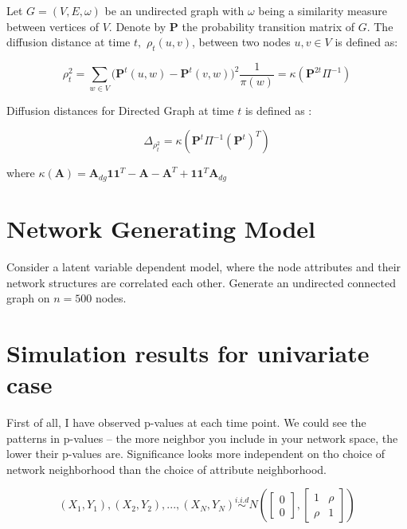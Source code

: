 \documentclass[12pt]{report}
\begin{document}
  
  Let $G = (V, E, \omega)$ be an undirected graph with $\omega$ being a similarity measure between vertices of $V.$ Denote by $\textbf{P}$ the probability transition matrix of $G.$ The diffusion distance at time $t,$ $\rho_{t}(u,v)$, between two nodes $u,v \in V$ is defined as:
  
  $$\rho^2_{t} = \sum\limits_{w \in V}\big( \textbf{P}^{t}(u,w) - \textbf{P}^{t}(v,w) \big)^2 \frac{1}{\pi(w)} =  \kappa(\textbf{P}^{2t} \Pi^{-1} )$$

 
Diffusion distances for Directed Graph at time $t$ is defined as :

$$\Delta_{\rho^{2}_{t}} = \kappa(\textbf{P}^{t} \Pi^{-1} (\textbf{P}^{t})^{T} )$$
 
where $\kappa(\textbf{A}) = \textbf{A}_{dg} \textbf{1} \textbf{1}^{T} - \textbf{A} - \textbf{A}^{T} + \textbf{1} \textbf{1}^{T} \textbf{A}_{dg}$ 


\section{Network Generating Model}
  
Consider a latent variable dependent model, where the node attributes and their network structures are correlated each other. Generate an undirected connected graph on $n=500$ nodes. 


  





\section{Simulation results for univariate case}

  First of all, I have observed p-values at each time point. We could see the patterns in p-values -- the more neighbor you include in your network space, the lower their p-values are. Significance looks more independent on tho choice of network neighborhood than the choice of attribute neighborhood.  

\begin{equation} 
\label{eq:latent}
(X_1, Y_1), (X_2, Y_2) , ... , (X_N, Y_N)  \overset{i.i.d}{\sim} N \left( \begin{bmatrix} 0 \\ 0 \end{bmatrix}, \begin{bmatrix}1 & \rho \\ \rho & 1 \end{bmatrix}  \right)
\end{equation}
\end{document}
